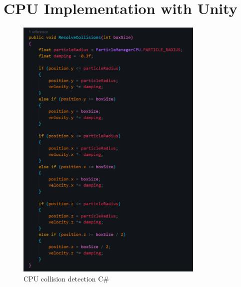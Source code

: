 \documentclass[a4paper, 12pt]{article}
\begin{document}
    \section{CPU Implementation with Unity}

    \begin{figure}[H]
        \centering
        \includegraphics[width=0.8\textwidth]{collisionDetectionCPU.png}
        \caption{CPU collision detection C\#}
    \end{figure}
\end{document}
